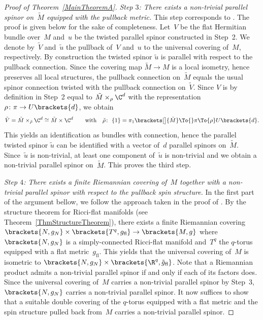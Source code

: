 \documentclass[10pt,a4paper]{amsart}
\numberwithin{equation}{section}
\begin{document}
\begin{proof}[Proof of Theorem~\ref{MainTheoremA}]
{\it Step $3$: There exists a non-trivial parallel spinor on~$\tilde{M}$ equipped with the pullback metric.} %
This step corresponds to \cite[Proposition~3.3]{Schick2021a}. The proof is given below for the sake of completeness. Let~$V$ be the flat Hermitian bundle over~$M$ and~$u$ be the twisted parallel spinor constructed in Step~2. We denote by~$\tilde{V}$ and~$\tilde{u}$ the pullback of~$V$ and~$u$ to the universal covering of~$M$, respectively. By construction the twisted spinor $\tilde{u}$ is parallel with respect to the pullback connection. Since the covering map $\tilde{M}\to M$ is a local isometry, hence preserves all local structures, the pullback connection on~$\tilde{M}$ equals the usual spinor connection twisted with the pullback connection on~$\tilde{V}$. Since $V$ is by definition in Step~2 equal to $\tilde{M}\times_{\rho} \C^d$ with the representation $\rho\colon \pi \to U\brackets{d}$, we obtain
\[
 \tilde{V}=\tilde{M}\times_{\tilde{\rho}}\C^d\cong\tilde{M}\times \C^d \qquad \text{with} \quad \tilde{\rho}\colon\ \{1\}=\pi_1\brackets[\big]{\tilde{M}}\To{} \pi \To{\rho} U\brackets{d}.
\]
This yields an identification  as bundles with connection, hence the parallel twisted spinor $\tilde{u}$ can be identified with a vector of~$d$ parallel spinors on~$\tilde{M}$. Since~$\tilde{u}$ is non-trivial, at least one component of~$\tilde{u}$ is non-trivial and we obtain a non-trivial parallel spinor on~$\tilde{M}$. This proves the third step.


{\it Step $4$: There exists a finite Riemannian covering of~$M$ together with a non-trivial parallel spinor with respect to the pullback spin structure.} %
In the first part of the argument bellow, we follow the approach taken in the proof of \cite[Lemma 2.7]{Schick2021a}. By the structure theorem for Ricci-flat manifolds (see Theorem~\ref{ThmStructureTheorem}), there exists a finite Riemannian covering~$\brackets{N,g_N}\times \brackets{T^q,g_{\text{fl}}} \to \brackets{M,g}$ where~$\brackets{N,g_N}$ is a simply-connected Ricci-flat manifold and~$T^q$ the $q$-torus equipped with a flat metric~$g_{\text{fl}}$. This yields that the universal covering of~$M$ is isometric to $\brackets{N,g_N}\times \brackets{\R^q,\tilde{g}_{\text{fl}}}$. Note that a Riemannian product admits a non-trivial parallel spinor if and only if each of its factors does. Since the universal covering of~$M$ carries a non-trivial parallel spinor by Step~3, $\brackets{N,g_N}$ carries a non-trivial parallel spinor. It now suffices to show that a suitable double covering of the $q$-torus equipped with a flat metric and the spin structure pulled back from~$M$ carries a non-trivial parallel spinor.


\end{proof}
\end{document}
